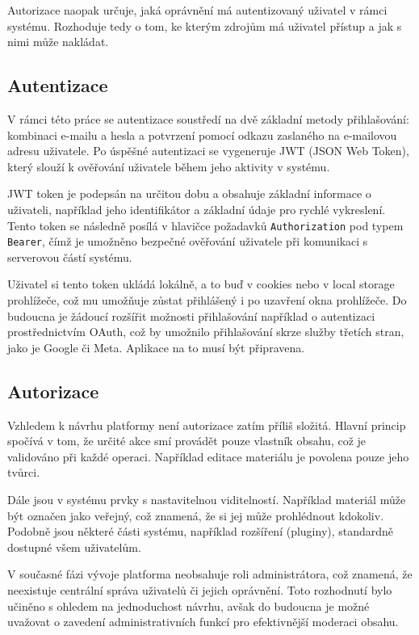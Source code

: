 Autorizace naopak určuje, jaká oprávnění má autentizovaný uživatel v rámci systému.
Rozhoduje tedy o tom, ke kterým zdrojům má uživatel přístup a jak s nimi může nakládat.

\subsection{Autentizace}

V rámci této práce se autentizace soustředí na dvě základní metody přihlašování: kombinaci e-mailu a hesla a potvrzení pomocí odkazu zaslaného na e-mailovou adresu uživatele. 
Po úspěšné autentizaci se vygeneruje JWT (JSON Web Token), který slouží k ověřování uživatele během jeho aktivity v systému.

JWT token je podepsán na určitou dobu a obsahuje základní informace o uživateli, například jeho identifikátor a základní údaje pro rychlé vykreslení. 
Tento token se následně posílá v hlavičce požadavků \texttt{Authorization} pod typem \texttt{Bearer}, čímž je umožněno bezpečné ověřování uživatele při komunikaci s serverovou částí systému.

Uživatel si tento token ukládá lokálně, a to buď v cookies nebo v local storage prohlížeče, což mu umožňuje zůstat přihlášený i po uzavření okna prohlížeče. 
Do budoucna je žádoucí rozšířit možnosti přihlašování například o autentizaci prostřednictvím OAuth, což by umožnilo přihlašování skrze služby třetích stran, jako je Google či Meta.
Aplikace na to musí být připravena.

\subsection{Autorizace}

Vzhledem k návrhu platformy není autorizace zatím příliš složitá. 
Hlavní princip spočívá v tom, že určité akce smí provádět pouze vlastník obsahu, což je validováno při každé operaci.
Například editace materiálu je povolena pouze jeho tvůrci. 

Dále jsou v systému prvky s nastavitelnou viditelností. 
Například materiál může být označen jako veřejný, což znamená, že si jej může prohlédnout kdokoliv. 
Podobně jsou některé části systému, například rozšíření (pluginy), standardně dostupné všem uživatelům.

V současné fázi vývoje platforma neobsahuje roli administrátora, což znamená, že neexistuje centrální správa uživatelů či jejich oprávnění. 
Toto rozhodnutí bylo učiněno s ohledem na jednoduchost návrhu, avšak do budoucna je možné uvažovat o zavedení administrativních funkcí pro efektivnější moderaci obsahu.


